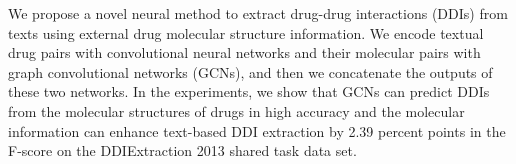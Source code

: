 We propose a novel neural method to extract drug-drug interactions (DDIs) from texts using external drug molecular structure information. We encode textual drug pairs with convolutional neural networks and their molecular pairs with graph convolutional networks (GCNs), and then we concatenate the outputs of these two networks. In the experiments, we show that GCNs can predict DDIs from the molecular structures of drugs in high accuracy and the molecular information can enhance text-based DDI extraction by 2.39 percent points in the F-score on the DDIExtraction 2013 shared task data set.
